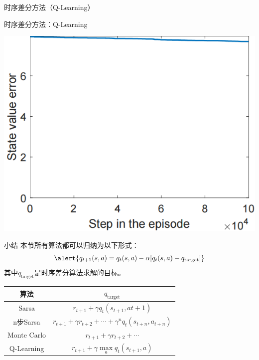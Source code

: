 \begin{section}{时序差分方法\alert{（Q-Learning）}}
\begin{frame}{时序差分方法：Q-Learning}
\begin{center}
\begin{minipage}{0.2\textwidth}
        \end{minipage}
        \hspace{1cm}
        \begin{minipage}{0.2\textwidth}
            \centering
            \includegraphics[width=\linewidth]{assets/e0.1statevalueerror2.jpg}
        \end{minipage}
    \end{center}
\end{frame}

\begin{frame}{小结}
    本节所有算法都可以归纳为以下形式：
    \[
        \alert{q_{t+1}(s,a)=q_t(s,a)-\alpha[q_t(s,a)-q_{\text{target}}]}
    \]
    其中$q_{\text{target}}$是时序差分算法求解的目标。
    \begin{table}[]
        \begin{tabular}{@{}cc@{}}
        \toprule
        算法    & $q_{\text{target}}$\\ \midrule
        Sarsa &  $r_{t+1}+\gamma q_t(s_{t+1}, a{t+1})$\\
        n步Sarsa & $r_{t+1}+\gamma r_{t+2} + \cdots + \gamma^nq_t(s_{t+n},a_{t+n})$ \\
        Monte Carlo &  $r_{t+1}+\gamma r_{t+2} + \cdots$\\
        Q-Learning &  $r_{t+1}+\gamma \underset{a}{\max}q_t(s_{t+1}, a)$\\
        \bottomrule
        \end{tabular}
    \end{table}
\end{frame}


\end{section}
